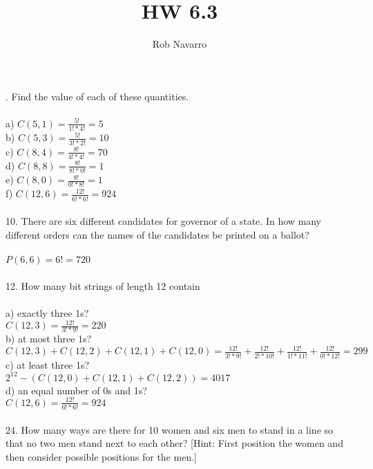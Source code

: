 \documentclass[11pt, oneside]{article}   	%
\title{HW 6.3}
\author{Rob Navarro}
\begin{document}
\maketitle

. Find the value of each of these quantities. \\\\
a) $C(5,1) = \frac{5!}{1! * 4!} = 5$\\
b) $C(5,3) = \frac{5!}{3! * 2!} = 10$\\ 
c) $C(8,4) = \frac{8!}{4! * 4!} = 70$\\ 
d) $C(8,8) = \frac{8!}{8! * 0!} = 1$\\ 
e) $C(8,0) = \frac{8!}{0! * 8!} = 1$\\
f) $C(12,6) = \frac{12!}{6! * 6!} = 924$\\\\
10. There are six different candidates for governor of a state. In how many different orders can the names of the candidates be printed on a ballot?\\\\
$P(6,6) = 6! =  720$\\\\
12. How many bit strings of length 12 contain\\\\
a) exactly three 1s?\\
$C(12,3) = \frac{12!}{3! * 9!} = 220$\\
b) at most three 1s?\\
$C(12,3) + C(12,2) + C(12,1) + C(12,0) = \frac{12!}{3! * 9!} + \frac{12!}{2! * 10!} + \frac{12!}{1! * 11!} + \frac{12!}{0! * 12!} = 299$\\  
c) at least three 1s?\\
$2^{12} - (C(12,0) + C(12,1) + C(12,2)) = 4017$\\
d) an equal number of 0s and 1s?\\
$C(12,6) = \frac{12!}{6! * 6!} = 924$\\\\
24. How many ways are there for 10 women and six men to stand in a line so that no two men stand next to each other? [Hint: First position the women and then consider possible positions for the men.]\\
\end{document}
